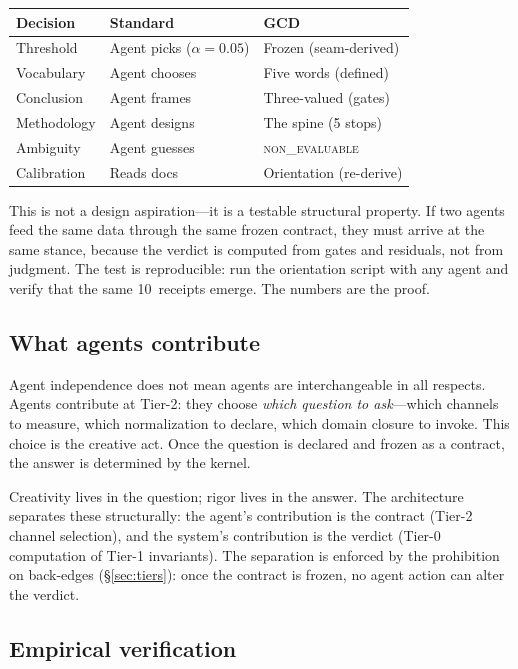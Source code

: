 \documentclass[
  aps,
  prd,
  twocolumn,
  superscriptaddress,
  nofootinbib,
  floatfix
]{revtex4-2}
\newcommand{\regime}[1]{\textrm{\upshape\scshape#1}}
\begin{document}
\begin{center}
{\small\begin{tabular}{@{}lp{2.4cm}p{3.0cm}@{}}
\toprule
\textbf{Decision} & \textbf{Standard} & \textbf{GCD} \\
\midrule
Threshold & Agent picks ($\alpha{=}0.05$) & Frozen (seam-derived) \\
Vocabulary & Agent chooses & Five words (defined) \\
Conclusion & Agent frames & Three-valued (gates) \\
Methodology & Agent designs & The spine (5 stops) \\
Ambiguity & Agent guesses & \regime{non\_evaluable} \\
Calibration & Reads docs & Orientation (re-derive) \\
\bottomrule
\end{tabular}}
\end{center}

\noindent This is not a design aspiration---it is a testable
structural property.  If two agents feed the same data through the
same frozen contract, they must arrive at the same stance, because
the verdict is computed from gates and residuals, not from
judgment.  The test is reproducible: run the orientation script
with any agent and verify that the same 10~receipts emerge.  The
numbers are the proof.

\subsection{What agents contribute}

Agent independence does not mean agents are interchangeable
in all respects.  Agents contribute at Tier-2: they choose
\emph{which question to ask}---which channels to measure,
which normalization to declare, which domain closure to invoke.
This choice is the creative act.  Once the question is declared
and frozen as a contract, the answer is determined by the kernel.

Creativity lives in the question; rigor lives in the answer.
The architecture separates these structurally: the agent's
contribution is the contract (Tier-2 channel selection), and the
system's contribution is the verdict (Tier-0 computation of
Tier-1 invariants).  The separation is enforced by the prohibition
on back-edges (\S\ref{sec:tiers}): once the contract is frozen,
no agent action can alter the verdict.

\subsection{Empirical verification}
\end{document}
